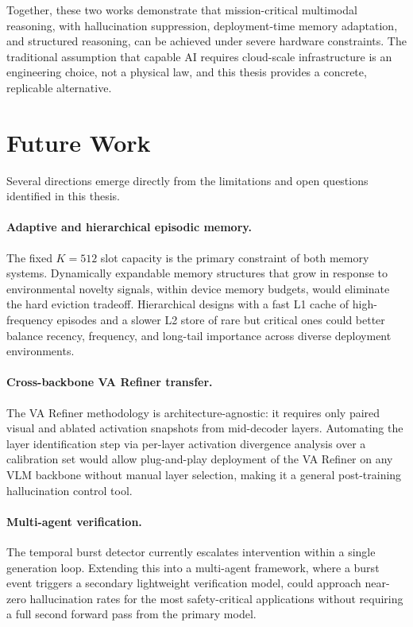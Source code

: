 Together, these two works demonstrate that mission-critical multimodal reasoning, with hallucination suppression, deployment-time memory adaptation, and structured reasoning, can be achieved under severe hardware constraints. The traditional assumption that capable AI requires cloud-scale infrastructure is an engineering choice, not a physical law, and this thesis provides a concrete, replicable alternative.

\section{Future Work}
\label{sec:future_work}

Several directions emerge directly from the limitations and open questions identified in this thesis.

\paragraph{Adaptive and hierarchical episodic memory.}
The fixed $K{=}512$ slot capacity is the primary constraint of both memory systems. Dynamically expandable memory structures that grow in response to environmental novelty signals, within device memory budgets, would eliminate the hard eviction tradeoff. Hierarchical designs with a fast L1 cache of high-frequency episodes and a slower L2 store of rare but critical ones could better balance recency, frequency, and long-tail importance across diverse deployment environments.

\paragraph{Cross-backbone VA Refiner transfer.}
The VA Refiner methodology is architecture-agnostic: it requires only paired visual and ablated activation snapshots from mid-decoder layers. Automating the layer identification step via per-layer activation divergence analysis over a calibration set would allow plug-and-play deployment of the VA Refiner on any VLM backbone without manual layer selection, making it a general post-training hallucination control tool.

\paragraph{Multi-agent verification.}
The temporal burst detector currently escalates intervention within a single generation loop. Extending this into a multi-agent framework, where a burst event triggers a secondary lightweight verification model, could approach near-zero hallucination rates for the most safety-critical applications without requiring a full second forward pass from the primary model.

